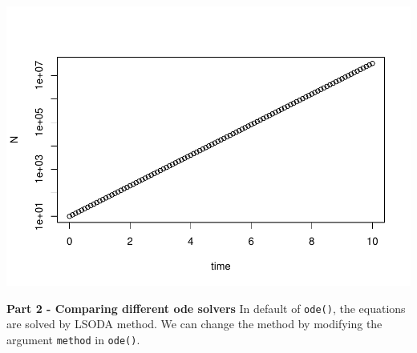 \documentclass[
]{book}
\begin{document}
\includegraphics{bookdown-demo_files/figure-latex/unnamed-chunk-5-2.pdf}

\textbf{Part 2 - Comparing different ode solvers}
In default of \texttt{ode()}, the equations are solved by LSODA method. We can change the method by modifying the argument \texttt{method} in \texttt{ode()}.
\end{document}
